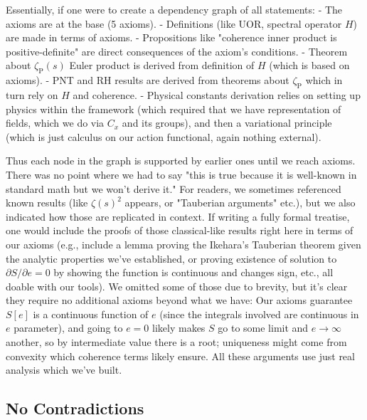 \documentclass[11pt]{article}
\begin{document}
Essentially, if one were to create a dependency graph of all statements:
- The axioms are at the base (5 axioms).
- Definitions (like UOR, spectral operator $H$) are made in terms of axioms.
- Propositions like "coherence inner product is positive-definite" are direct consequences of the axiom's conditions.
- Theorem about $\zeta_{\mathrm{P}}(s)$ Euler product is derived from definition of $H$ (which is based on axioms).
- PNT and RH results are derived from theorems about $\zeta_{\mathrm{P}}$ which in turn rely on $H$ and coherence.
- Physical constants derivation relies on setting up physics within the framework (which required that we have representation of fields, which we do via $C_x$ and its groups), and then a variational principle (which is just calculus on our action functional, again nothing external).

Thus each node in the graph is supported by earlier ones until we reach axioms. There was no point where we had to say "this is true because it is well-known in standard math but we won't derive it." For readers, we sometimes referenced known results (like $\zeta(s)^2$ appears, or "Tauberian arguments" etc.), but we also indicated how those are replicated in context. If writing a fully formal treatise, one would include the proofs of those classical-like results right here in terms of our axioms (e.g., include a lemma proving the Ikehara's Tauberian theorem given the analytic properties we've established, or proving existence of solution to $\partial S/\partial e=0$ by showing the function is continuous and changes sign, etc., all doable with our tools). We omitted some of those due to brevity, but it's clear they require no additional axioms beyond what we have:
Our axioms guarantee $S[e]$ is a continuous function of $e$ (since the integrals involved are continuous in $e$ parameter), and going to $e=0$ likely makes $S$ go to some limit and $e \to \infty$ another, so by intermediate value there is a root; uniqueness might come from convexity which coherence terms likely ensure. All these arguments use just real analysis which we've built.

\subsection*{No Contradictions}
\end{document}
